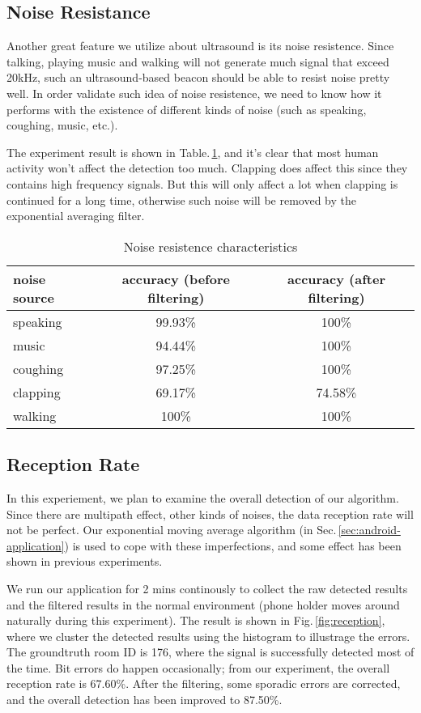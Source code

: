 \subsection{Noise Resistance}
\label{sec:noise-resistance}
Another great feature we utilize about ultrasound is its noise resistence. Since talking, playing music and walking will not generate much signal that exceed 20kHz, such an ultrasound-based beacon should be able to resist noise pretty well. In order validate such idea of noise resistence, we need to know how it performs with the existence of different kinds of noise (such as speaking, coughing, music, etc.). 

The experiment result is shown in Table.\,\ref{tab:noiseres}, and it's clear that most human activity won't affect the detection too much. Clapping does affect this since they contains high frequency signals. But this will only affect a lot when clapping is continued for a long time, otherwise such noise will be removed by the exponential averaging filter.
\begin{table}
  \centering
  \begin{tabular}{|l|c|c|}
    \hline
    noise source & accuracy (before filtering) & accuracy (after filtering) \\
    \hline
    speaking &  99.93\% & 100\% \\
    music  &  94.44\% & 100\% \\
    coughing & 97.25\% & 100\% \\
    clapping & 69.17\% & 74.58\% \\
    walking & 100\% & 100\% \\
    \hline
  \end{tabular}
  \caption{Noise resistence characteristics}
  \label{tab:noiseres}
\end{table}

\subsection{Reception Rate}
\label{sec:reception-rate}
In this experiement, we plan to examine the overall detection of our algorithm. Since there are multipath effect, other kinds of noises, the data reception rate will not be perfect. Our exponential moving average algorithm (in Sec.\,\ref{sec:android-application}) is used to cope with these imperfections, and some effect has been shown in previous experiments.

We run our application for 2 mins continously to collect the raw detected results and the filtered results in the normal environment (phone holder moves around naturally during this experiment). The result is shown in Fig.\,\ref{fig:reception}, where we cluster the detected results using the histogram to illustrage the errors. The groundtruth room ID is 176, where the signal is successfully detected most of the time. Bit errors do happen occasionally; from our experiment, the overall reception rate is 67.60\%. After the filtering, some sporadic errors are corrected, and the overall detection has been improved to 87.50\%. 


